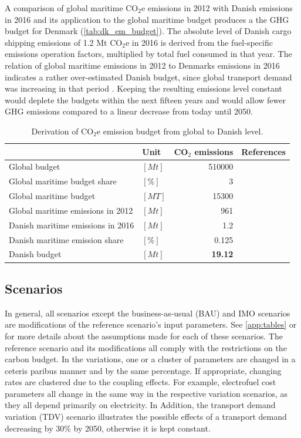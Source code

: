 \documentclass[article]{elsarticle}
\begin{document}
A comparison of global maritime CO$_2$e emissions in 2012 with Danish emissions in 2016 and its application to the global maritime budget produces a the GHG budget for Denmark (\autoref{tab:dk_em_budget}). The absolute level of Danish cargo shipping emissions of 1.2 Mt CO$_2$e in 2016 is derived from the fuel-specific emissions operation factors, multiplied by total fuel consumed in that year. The relation of global maritime emissions in 2012 to Denmarks emissions in 2016 indicates a rather over-estimated Danish budget, since global transport demand was increasing in that period \cite[Tab.~3,~p.~5]{UNCTAD2017}. Keeping the resulting emissions level constant would deplete the budgets within the next fifteen years and would allow fewer GHG emissions compared to a linear decrease from today until 2050.
\begin{table}[htb]
    \centering
    \begin{tabular}{llrr}
        \toprule
         & Unit & CO$_2$ emissions & References \\
         \midrule
         Global budget & $\left[Mt\right]$ & 510000 & \cite{IPCC2013} \\
         Global maritime budget share & $\left[\%\right]$ & 3 & \cite{Olmer2017} \\
         Global maritime budget & $\left[MT\right]$ & 15300 &\\[1.5ex]
         Global maritime emissions in 2012 & $\left[Mt\right]$ & 961 & \cite{Smith2014} \\
         Danish maritime emissions in 2016 & $\left[Mt\right]$ & 1.2 & \cite{Kristensen2012,Eurostat2018,Wisdom2017} \\
         Danish maritime emission share & $\left[\%\right]$ & 0.125 &\\[1.5ex]
         Danish budget & $\left[Mt\right]$ & \textbf{19.12} & \\
         \bottomrule
    \end{tabular}
    \caption{Derivation of CO$_2$e emission budget from global to Danish level.}
    \label{tab:dk_em_budget}
\end{table}


\subsection{Scenarios}
\label{subsec:Sce}
In general, all scenarios except the business-as-usual (BAU) and IMO scenarios are modifications of the reference scenario's input parameters. See \ref{app:tables} or \cite{Thesis2018} for more details about the assumptions made for each of these scenarios. The reference scenario and its modifications all comply with the restrictions on the carbon budget. In the variations, one or a cluster of parameters are changed in a ceteris paribus manner and by the same percentage. If appropriate, changing rates are clustered due to the coupling effects. For example, electrofuel cost parameters all change in the same way in the respective variation scenarios, as they all depend primarily on electricity. In Addition, the transport demand variation (TDV) scenario illustrates the possible effects of a transport demand decreasing by 30\% by 2050, otherwise it is kept constant.
\end{document}
